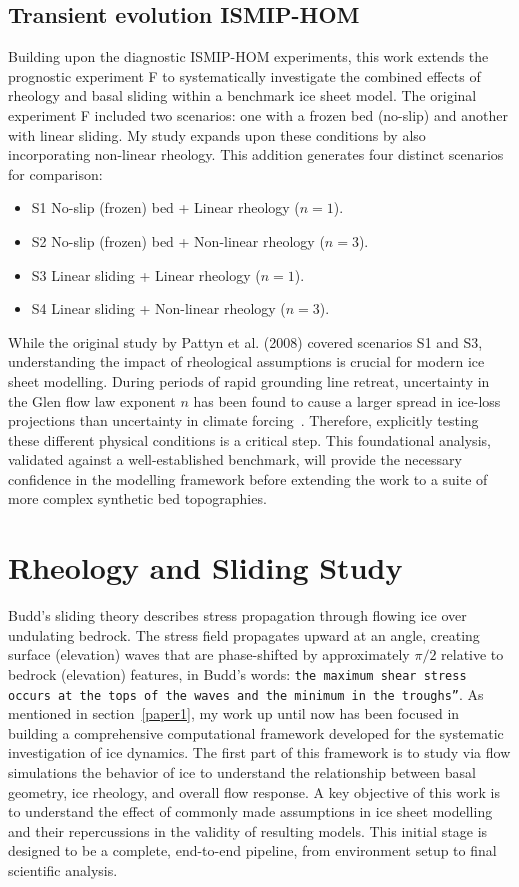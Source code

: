 \subsection{Transient evolution ISMIP-HOM}\label{transient_ismip}
Building upon the diagnostic ISMIP-HOM experiments, this work extends the prognostic experiment F to systematically investigate the combined effects of rheology and basal sliding within a benchmark ice sheet model. The original experiment F included two scenarios: one with a frozen bed (no-slip) and another with linear sliding. My study expands upon these conditions by also incorporating non-linear rheology. This addition generates four distinct scenarios for comparison:
\begin{itemize}
\item{S1} No-slip (frozen) bed + Linear rheology ($n=1$).
\item{S2} No-slip (frozen) bed + Non-linear rheology ($n=3$).
\item{S3} Linear sliding + Linear rheology ($n=1$).
\item{S4} Linear sliding + Non-linear rheology ($n=3$).
\end{itemize}
While the original study by Pattyn et al. (2008) covered scenarios S1 and S3, understanding the impact of rheological assumptions is crucial for modern ice sheet modelling. During periods of rapid grounding line retreat, uncertainty in the Glen flow law exponent $n$ has been found to cause a larger spread in ice-loss projections than uncertainty in climate forcing~\cite{Getraer_2025}. Therefore, explicitly testing these different physical conditions is a critical step. This foundational analysis, validated against a well-established benchmark, will provide the necessary confidence in the modelling framework before extending the work to a suite of more complex synthetic bed topographies.
\section{Rheology and Sliding Study}\label{study1}
Budd's sliding theory describes stress propagation through flowing ice over undulating bedrock. The stress field propagates upward at an angle, creating surface (elevation) waves that are phase-shifted by approximately $\pi/2$ relative to bedrock (elevation) features, in Budd's words: \texttt{\texttt{the maximum shear stress occurs at the tops of the waves and the minimum in the troughs''\cite{Budd_1970}}}. 
As mentioned in section~\ref{paper1}, my work up until now has been focused in building a comprehensive computational framework developed for the systematic investigation of ice dynamics. The first part of this framework is to study via flow simulations the behavior of ice to understand the relationship between basal geometry, ice rheology, and overall flow response. A key objective of this work is to understand the effect of commonly made assumptions in ice sheet modelling and their repercussions in the validity of resulting models. This initial stage is designed to be a complete, end-to-end pipeline, from environment setup to final scientific analysis. 

